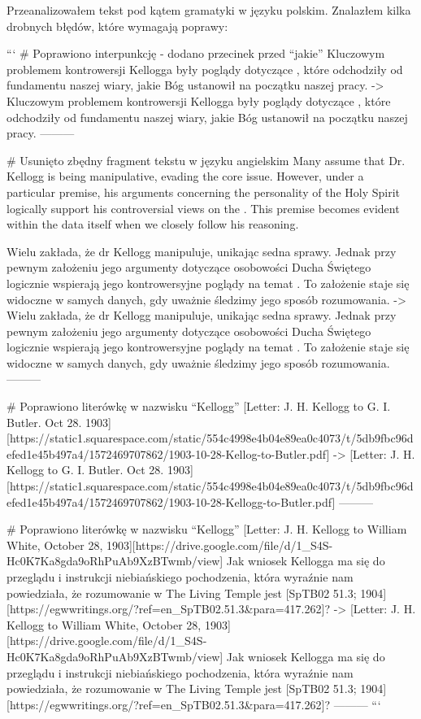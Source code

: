 Przeanalizowałem tekst pod kątem gramatyki w języku polskim. Znalazłem kilka drobnych błędów, które wymagają poprawy:

```
# Poprawiono interpunkcję - dodano przecinek przed “jakie”
Kluczowym problemem kontrowersji  Kellogga były poglądy dotyczące , które odchodziły od fundamentu naszej wiary, jakie Bóg ustanowił na początku naszej pracy.
->
Kluczowym problemem kontrowersji  Kellogga były poglądy dotyczące , które odchodziły od fundamentu naszej wiary, jakie Bóg ustanowił na początku naszej pracy.
---------

# Usunięto zbędny fragment tekstu w języku angielskim
Many assume that Dr. Kellogg is being manipulative, evading the core issue. However, under a particular premise, his arguments concerning the personality of the Holy Spirit logically support his controversial views on the . This premise becomes evident within the data itself when we closely follow his reasoning.


Wielu zakłada, że dr Kellogg manipuluje, unikając sedna sprawy. Jednak przy pewnym założeniu jego argumenty dotyczące osobowości Ducha Świętego logicznie wspierają jego kontrowersyjne poglądy na temat . To założenie staje się widoczne w samych danych, gdy uważnie śledzimy jego sposób rozumowania.
->
Wielu zakłada, że dr Kellogg manipuluje, unikając sedna sprawy. Jednak przy pewnym założeniu jego argumenty dotyczące osobowości Ducha Świętego logicznie wspierają jego kontrowersyjne poglądy na temat . To założenie staje się widoczne w samych danych, gdy uważnie śledzimy jego sposób rozumowania.
---------

# Poprawiono literówkę w nazwisku “Kellogg”
[Letter: J. H. Kellogg to G. I. Butler. Oct 28. 1903][https://static1.squarespace.com/static/554c4998e4b04e89ea0c4073/t/5db9fbc96defed1e45b497a4/1572469707862/1903-10-28-Kellog-to-Butler.pdf]
->
[Letter: J. H. Kellogg to G. I. Butler. Oct 28. 1903][https://static1.squarespace.com/static/554c4998e4b04e89ea0c4073/t/5db9fbc96defed1e45b497a4/1572469707862/1903-10-28-Kellogg-to-Butler.pdf]
---------

# Poprawiono literówkę w nazwisku “Kellogg”
[Letter: J. H. Kellogg to William White, October 28, 1903][https://drive.google.com/file/d/1\_S4S-Hc0K7Ka8gda9oRhPuAb9XzBTwmb/view] Jak wniosek Kellogga ma się do przeglądu i instrukcji niebiańskiego pochodzenia, która wyraźnie nam powiedziała, że rozumowanie w The Living Temple jest [SpTB02 51.3; 1904][https://egwwritings.org/?ref=en\_SpTB02.51.3&para=417.262]?
->
[Letter: J. H. Kellogg to William White, October 28, 1903][https://drive.google.com/file/d/1\_S4S-Hc0K7Ka8gda9oRhPuAb9XzBTwmb/view] Jak wniosek Kellogga ma się do przeglądu i instrukcji niebiańskiego pochodzenia, która wyraźnie nam powiedziała, że rozumowanie w The Living Temple jest [SpTB02 51.3; 1904][https://egwwritings.org/?ref=en\_SpTB02.51.3&para=417.262]?
---------
```

